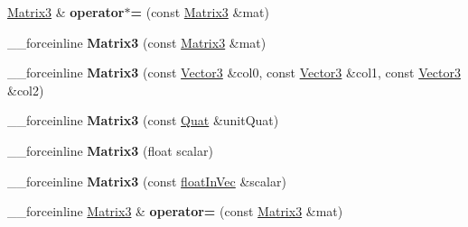 \begin{DoxyCompactItemize}
\item 
\hypertarget{classVectormath_1_1Aos_1_1Matrix3_ac41072ce7f3bf177037085ff23671b55}{\hyperlink{classVectormath_1_1Aos_1_1Matrix3}{Matrix3} \& {\bfseries operator$\ast$=} (const \hyperlink{classVectormath_1_1Aos_1_1Matrix3}{Matrix3} \&mat)}\label{classVectormath_1_1Aos_1_1Matrix3_ac41072ce7f3bf177037085ff23671b55}

\item 
\hypertarget{classVectormath_1_1Aos_1_1Matrix3_a3e073b4d8297328a7d63fa80657752df}{\-\_\-\-\_\-forceinline {\bfseries Matrix3} (const \hyperlink{classVectormath_1_1Aos_1_1Matrix3}{Matrix3} \&mat)}\label{classVectormath_1_1Aos_1_1Matrix3_a3e073b4d8297328a7d63fa80657752df}

\item 
\hypertarget{classVectormath_1_1Aos_1_1Matrix3_a4f5ff411513382c646cd1aa71111c4bc}{\-\_\-\-\_\-forceinline {\bfseries Matrix3} (const \hyperlink{classVectormath_1_1Aos_1_1Vector3}{Vector3} \&col0, const \hyperlink{classVectormath_1_1Aos_1_1Vector3}{Vector3} \&col1, const \hyperlink{classVectormath_1_1Aos_1_1Vector3}{Vector3} \&col2)}\label{classVectormath_1_1Aos_1_1Matrix3_a4f5ff411513382c646cd1aa71111c4bc}

\item 
\hypertarget{classVectormath_1_1Aos_1_1Matrix3_a3fa42f848e2674bcadf512fe13a015ea}{\-\_\-\-\_\-forceinline {\bfseries Matrix3} (const \hyperlink{classVectormath_1_1Aos_1_1Quat}{Quat} \&unit\-Quat)}\label{classVectormath_1_1Aos_1_1Matrix3_a3fa42f848e2674bcadf512fe13a015ea}

\item 
\hypertarget{classVectormath_1_1Aos_1_1Matrix3_ab789a362d913ac070001534adb906e0c}{\-\_\-\-\_\-forceinline {\bfseries Matrix3} (float scalar)}\label{classVectormath_1_1Aos_1_1Matrix3_ab789a362d913ac070001534adb906e0c}

\item 
\hypertarget{classVectormath_1_1Aos_1_1Matrix3_a5697c83e0e456250fa3e58f058ad16f1}{\-\_\-\-\_\-forceinline {\bfseries Matrix3} (const \hyperlink{classVectormath_1_1floatInVec}{float\-In\-Vec} \&scalar)}\label{classVectormath_1_1Aos_1_1Matrix3_a5697c83e0e456250fa3e58f058ad16f1}

\item 
\hypertarget{classVectormath_1_1Aos_1_1Matrix3_ac1f486e267dd02f72a3fbe9d354ff0d2}{\-\_\-\-\_\-forceinline \hyperlink{classVectormath_1_1Aos_1_1Matrix3}{Matrix3} \& {\bfseries operator=} (const \hyperlink{classVectormath_1_1Aos_1_1Matrix3}{Matrix3} \&mat)}\label{classVectormath_1_1Aos_1_1Matrix3_ac1f486e267dd02f72a3fbe9d354ff0d2}


\end{DoxyCompactItemize}

